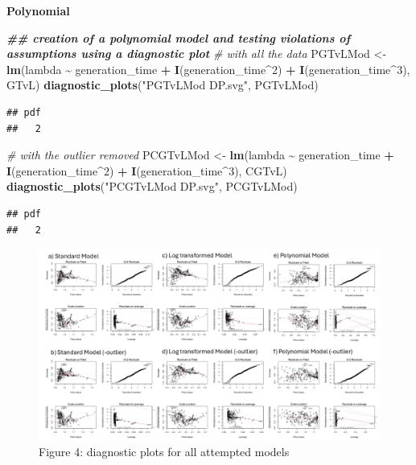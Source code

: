 \documentclass[
]{article}
\newenvironment{Shaded}{\begin{snugshade}}{\end{snugshade}}
\newcommand{\CommentTok}[1]{\textcolor[rgb]{0.56,0.35,0.01}{\textit{#1}}}
\newcommand{\DecValTok}[1]{\textcolor[rgb]{0.00,0.00,0.81}{#1}}
\newcommand{\DocumentationTok}[1]{\textcolor[rgb]{0.56,0.35,0.01}{\textbf{\textit{#1}}}}
\newcommand{\FunctionTok}[1]{\textcolor[rgb]{0.13,0.29,0.53}{\textbf{#1}}}
\newcommand{\NormalTok}[1]{#1}
\newcommand{\OtherTok}[1]{\textcolor[rgb]{0.56,0.35,0.01}{#1}}
\newcommand{\SpecialCharTok}[1]{\textcolor[rgb]{0.81,0.36,0.00}{\textbf{#1}}}
\newcommand{\StringTok}[1]{\textcolor[rgb]{0.31,0.60,0.02}{#1}}
\begin{document}
\textbf{Polynomial}

\begin{Shaded}
\begin{Highlighting}[]
\DocumentationTok{\#\# creation of a polynomial model and testing violations of assumptions using a diagnostic plot}
\CommentTok{\# with all the data}
\NormalTok{PGTvLMod }\OtherTok{\textless{}{-}} \FunctionTok{lm}\NormalTok{(lambda }\SpecialCharTok{\textasciitilde{}}\NormalTok{ generation\_time }\SpecialCharTok{+} \FunctionTok{I}\NormalTok{(generation\_time}\SpecialCharTok{\^{}}\DecValTok{2}\NormalTok{) }\SpecialCharTok{+} \FunctionTok{I}\NormalTok{(generation\_time}\SpecialCharTok{\^{}}\DecValTok{3}\NormalTok{), GTvL)}
\FunctionTok{diagnostic\_plots}\NormalTok{(}\StringTok{"PGTvLMod DP.svg"}\NormalTok{, PGTvLMod)}
\end{Highlighting}
\end{Shaded}

\begin{verbatim}
## pdf 
##   2
\end{verbatim}

\begin{Shaded}
\begin{Highlighting}[]
\CommentTok{\# with the outlier removed}
\NormalTok{PCGTvLMod }\OtherTok{\textless{}{-}} \FunctionTok{lm}\NormalTok{(lambda }\SpecialCharTok{\textasciitilde{}}\NormalTok{ generation\_time }\SpecialCharTok{+} \FunctionTok{I}\NormalTok{(generation\_time}\SpecialCharTok{\^{}}\DecValTok{2}\NormalTok{) }\SpecialCharTok{+} \FunctionTok{I}\NormalTok{(generation\_time}\SpecialCharTok{\^{}}\DecValTok{3}\NormalTok{), CGTvL)}
\FunctionTok{diagnostic\_plots}\NormalTok{(}\StringTok{"PCGTvLMod DP.svg"}\NormalTok{, PCGTvLMod)}
\end{Highlighting}
\end{Shaded}

\begin{verbatim}
## pdf 
##   2
\end{verbatim}

\begin{figure}
\centering
\includegraphics{Figures/Diagnostic plots.png}
\caption{Figure 4: diagnostic plots for all attempted models}
\end{figure}
\end{document}
